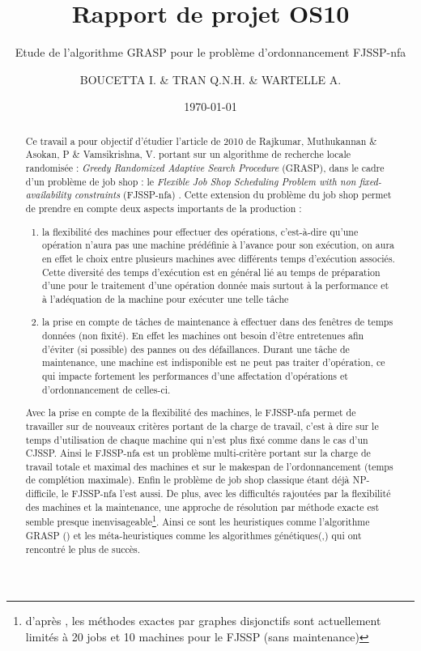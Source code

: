 \documentclass[10pt,a4paper]{scrartcl}
\author{\textsc{BOUCETTA I.} \& \textsc{TRAN Q.N.H.} \& \textsc{WARTELLE A.}}
\title{Rapport de projet OS10}
\subtitle{Etude de l'algorithme GRASP pour le problème d'ordonnancement FJSSP-nfa}
\date{\today}
\begin{document}
\maketitle
\renewcommand{\contentsname}{Sommaire}
\tableofcontents
\clearpage

\begin{abstract}
Ce travail a pour objectif d'étudier l'article de 2010 de Rajkumar, Muthukannan \& Asokan, P \& Vamsikrishna, V.
portant sur un algorithme de recherche locale randomisée : \emph{Greedy Randomized Adaptive Search Procedure} (GRASP),
dans le cadre d'un problème de job shop : le \emph{Flexible Job Shop Scheduling Problem with non fixed-availability constraints}
(FJSSP-nfa) \cite{GRASP}. 
Cette extension du problème du job shop permet de prendre en compte deux aspects importants de la production :
\begin{enumerate}
\item la flexibilité des machines pour effectuer des opérations, c'est-à-dire qu'une opération n'aura pas une machine
prédéfinie à l'avance pour son exécution, on aura en effet le choix entre plusieurs machines avec différents temps
d'exécution associés. Cette diversité des temps d'exécution est en général lié au temps de préparation d'une
pour le traitement d'une opération donnée mais surtout à la performance et à l'adéquation de la machine
pour exécuter une telle tâche
\item la prise en compte de tâches de maintenance à effectuer dans des fenêtres de temps données (non fixité). En effet
les machines ont besoin d'être entretenues afin d'éviter (si possible) des pannes ou des défaillances. Durant une
tâche de maintenance, une machine est indisponible est ne peut pas traiter d'opération, ce qui impacte fortement
les performances d'une affectation d'opérations et d'ordonnancement de celles-ci.
\end{enumerate}
Avec la prise en compte de la flexibilité des machines, le FJSSP-nfa permet de travailler sur de nouveaux
critères portant de la charge de travail, c'est à dire sur le temps d'utilisation de chaque machine qui
n'est plus fixé comme dans le cas d'un CJSSP. Ainsi le FJSSP-nfa est un problème multi-critère portant
sur la charge de travail totale et maximal des machines et sur le makespan de l'ordonnancement (temps
de complétion maximale).
Enfin le problème de job shop classique étant déjà NP-difficile, le FJSSP-nfa l'est aussi.
De plus, avec les difficultés rajoutées par la flexibilité des machines et la maintenance,
une approche de résolution par méthode exacte est semble presque inenvisageable\footnote{d'après \cite{GA1},
les méthodes exactes par graphes disjonctifs sont actuellement limités à 20 jobs et 10 machines pour
le FJSSP (sans maintenance)}. Ainsi ce sont les heuristiques comme l'algorithme GRASP (\cite{GRASP}) 
et les méta-heuristiques comme les algorithmes génétiques(\cite{GA1},\cite{GA2}) qui ont rencontré le plus de succès.

\end{abstract}
\end{document}
